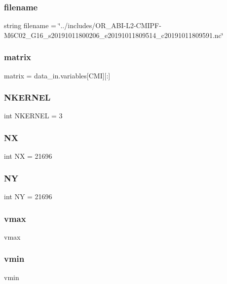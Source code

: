 \subsubsection{filename}
{\footnotesize\ttfamily string filename = \char`\"{}../includes/O\+R\+\_\+\+A\+BI-\/L2-\/C\+M\+I\+PF-\/M6\+C02\+\_\+\+G16\+\_\+s20191011800206\+\_\+e20191011809514\+\_\+c20191011809591.\+nc\char`\"{}}

\mbox{\label{namespacemain_af439574c0feeeae882d3b65a7b2e88bf}} 
\subsubsection{matrix}
{\footnotesize\ttfamily matrix = data\+\_\+in.\+variables[\textquotesingle{}C\+MI\textquotesingle{}][\+:]}

\mbox{\label{namespacemain_a0ed318157b0de78302ca944f622aa044}} 
\subsubsection{NKERNEL}
{\footnotesize\ttfamily int N\+K\+E\+R\+N\+EL = 3}

\mbox{\label{namespacemain_ab304b26016ce886af898dfdaed93a120}} 
\subsubsection{NX}
{\footnotesize\ttfamily int NX = 21696}

\mbox{\label{namespacemain_a7fb159d0f2febd3c31b799dd641e8da7}} 
\subsubsection{NY}
{\footnotesize\ttfamily int NY = 21696}

\mbox{\label{namespacemain_ac1a7ae143b847c0d61e8abc668d3d1fa}} 
\subsubsection{vmax}
{\footnotesize\ttfamily vmax}

\mbox{\label{namespacemain_aa8bf729ba75cfc1e378ba8b5a4ef782b}} 
\subsubsection{vmin}
{\footnotesize\ttfamily vmin}

